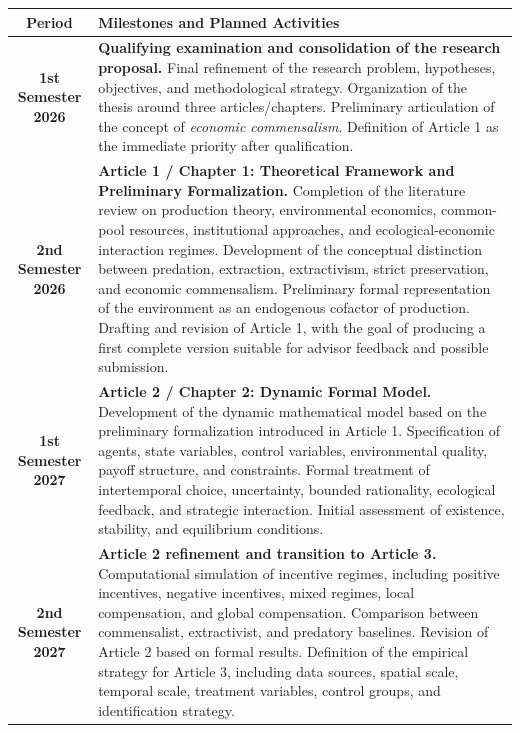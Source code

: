 \begin{table}[H]
\centering
\renewcommand{\arraystretch}{1.35}
\footnotesize
\begin{tabularx}{\textwidth}{|c|X|}
\hline
\textbf{Period} & \textbf{Milestones and Planned Activities} \\
\hline

\textbf{1st Semester 2026} 
& 
\textbf{Qualifying examination and consolidation of the research proposal.} 
Final refinement of the research problem, hypotheses, objectives, and methodological strategy. 
Organization of the thesis around three articles/chapters. 
Preliminary articulation of the concept of \emph{economic commensalism}. 
Definition of Article 1 as the immediate priority after qualification. \\
\hline

\textbf{2nd Semester 2026} 
& 
\textbf{Article 1 / Chapter 1: Theoretical Framework and Preliminary Formalization.} 
Completion of the literature review on production theory, environmental economics, common-pool resources, institutional approaches, and ecological-economic interaction regimes. 
Development of the conceptual distinction between predation, extraction, extractivism, strict preservation, and economic commensalism. 
Preliminary formal representation of the environment as an endogenous cofactor of production. 
Drafting and revision of Article 1, with the goal of producing a first complete version suitable for advisor feedback and possible submission. \\
\hline

\textbf{1st Semester 2027} 
& 
\textbf{Article 2 / Chapter 2: Dynamic Formal Model.} 
Development of the dynamic mathematical model based on the preliminary formalization introduced in Article 1. 
Specification of agents, state variables, control variables, environmental quality, payoff structure, and constraints. 
Formal treatment of intertemporal choice, uncertainty, bounded rationality, ecological feedback, and strategic interaction. 
Initial assessment of existence, stability, and equilibrium conditions. \\
\hline

\textbf{2nd Semester 2027} 
& 
\textbf{Article 2 refinement and transition to Article 3.} 
Computational simulation of incentive regimes, including positive incentives, negative incentives, mixed regimes, local compensation, and global compensation. 
Comparison between commensalist, extractivist, and predatory baselines. 
Revision of Article 2 based on formal results. 
Definition of the empirical strategy for Article 3, including data sources, spatial scale, temporal scale, treatment variables, control groups, and identification strategy. \\
\hline


\end{tabularx}
\end{table}
